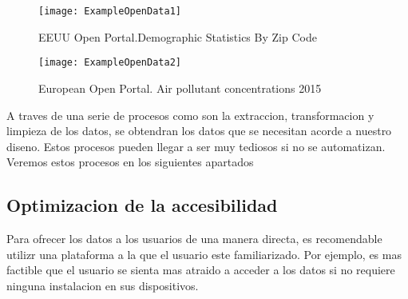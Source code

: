 \begin{figure}[h]
    \centering
    \texttt{[image: ExampleOpenData1]}
    \caption{EEUU Open Portal.Demographic Statistics By Zip Code}
    \end{figure}

    \begin{figure}[h]
    \centering
    \texttt{[image: ExampleOpenData2]}
    \caption{European Open Portal. Air pollutant concentrations 2015} 
   
 
\end{figure}

\newpage
    
A traves de una serie de procesos como son  la extraccion, transformacion y 
limpieza de los datos, se obtendran los datos que se necesitan acorde a nuestro diseno. Estos procesos pueden llegar
a ser muy tediosos si no se automatizan.
Veremos estos procesos en los siguientes apartados\\
    

\subsection{Optimizacion de la accesibilidad}

Para ofrecer los datos a los usuarios de una manera directa, es recomendable utilizr una plataforma a la que el usuario
este familiarizado. Por ejemplo, es mas factible que el usuario se sienta mas atraido a acceder a los datos si no requiere
ninguna instalacion en sus dispositivos.

\begin{comment}
    

    ----Respecto a polucion del aire 
    Acudir a fuentes privadas
    Instalacion de dispositivos
  Done-  Ejemplos de bases de datos de distintas ciudades capitales


    --no plataformas de pago
Done -no instalacion de software
-no complicaciones por parte del usuario.

--Datos automatizados -- formato maquina
--almacenamiento
--conocimientos informaticos
--analiticos
--estudio de la materia, ver que es importante o no, contrastarlo
--equipo multidisciplinario
--informaticos no son expertos en medicina, por ejemplo.
\begin{itemize}

    \item datos disponible
    \item no substraible por el usuario medio
    \item imposible de tratar sin una estructura
    \item no es posible de tener un historico
    \item sin informacion complementaria que muestre informacion util
    \item Desperdicio
    \item \end{itemize}

---Si fuera necesario, se le puede proporcionar las herramientas para que pueda entenderlo, en los 
casos mas complicados donde se necesitan conocimientos previos sobre la materia.

---Incluir concepto de muestras
\end{comment}  
    